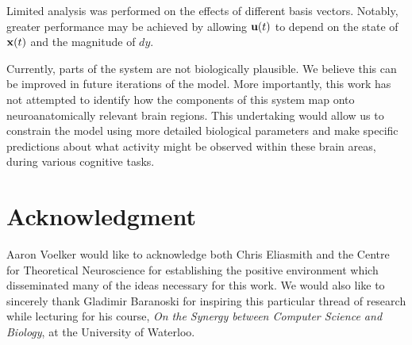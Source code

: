 \documentclass[letterpaper, 10 pt, conference]{ieeeconf}  %
\newcommand{\bolds}[1]{{\bf #1}}
\begin{document}
Limited analysis was performed on the effects of different basis vectors. Notably, greater performance may be achieved by allowing $\bolds{u}(t)$ to depend on the state of $\bolds{x}(t)$ and the magnitude of $dy$.

Currently, parts of the system are not biologically plausible. We believe this can be improved in future iterations of the model. More importantly, this work has not attempted to identify how the components of this system map onto neuroanatomically relevant brain regions. This undertaking would allow us to constrain the model using more detailed biological parameters and make specific predictions about what activity might be observed within these brain areas, during various cognitive tasks.

\section*{Acknowledgment}

Aaron Voelker would like to acknowledge both Chris Eliasmith and the Centre for Theoretical Neuroscience for establishing the positive environment which disseminated many of the ideas necessary for this work. We would also like to sincerely thank Gladimir Baranoski for inspiring this particular thread of research while lecturing for his course, {\it On the Synergy between Computer Science and Biology}, at the University of Waterloo.



\end{document}
